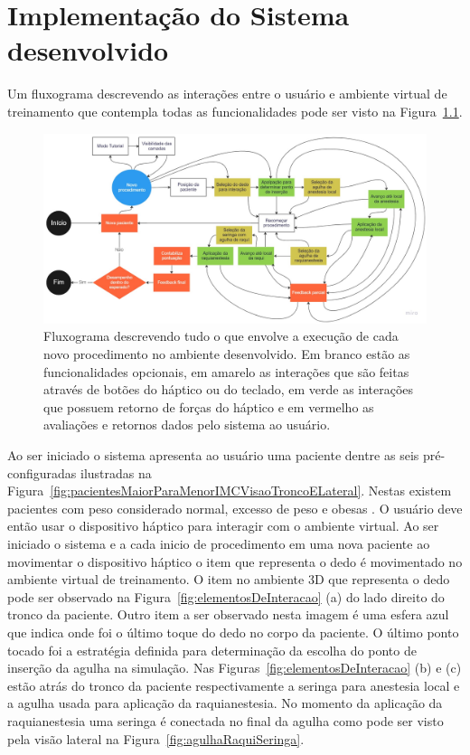 \chapter{Implementação do Sistema desenvolvido} \label{cap:cap5}

Um fluxograma descrevendo as interações entre o usuário e ambiente virtual de treinamento que contempla todas as funcionalidades pode ser visto na 
Figura~\ref{fig:fluxogramaAmbiente}.

\begin{figure}[ht!]
    \centering
    \includegraphics[width=0.98\linewidth]{capitulos/figuras/fluxograma-ambiente-desenvolvido.jpg} 
    \caption{Fluxograma descrevendo tudo o que envolve a execução de cada novo procedimento no ambiente desenvolvido. Em branco estão as funcionalidades opcionais, em amarelo as interações que são feitas através de botões do háptico ou do teclado, em verde as interações que possuem retorno de forças do háptico e em vermelho as avaliações e retornos dados pelo sistema ao usuário.}
    \label{fig:fluxogramaAmbiente}
\end{figure}

Ao ser iniciado o sistema apresenta ao usuário uma paciente dentre as seis pré-configuradas ilustradas na Figura~\ref{fig:pacientesMaiorParaMenorIMCVisaoTroncoELateral}. Nestas existem pacientes com peso considerado normal, excesso de peso e obesas \cite{MTILLC2019}. O usuário deve então usar o dispositivo háptico para interagir com o ambiente virtual. Ao ser iniciado o sistema e a cada inicio de procedimento em uma nova paciente ao movimentar o dispositivo háptico o item que representa o dedo é movimentado no ambiente virtual de treinamento. O item no ambiente 3D que representa o dedo pode ser observado na Figura~\ref{fig:elementosDeInteracao} (a) do lado direito do tronco da paciente. Outro item a ser observado nesta imagem é uma esfera azul que indica onde foi o último toque do dedo no corpo da paciente. O último ponto tocado foi a estratégia definida para determinação da escolha do ponto de inserção da agulha na simulação. Nas Figuras~\ref{fig:elementosDeInteracao} (b) e (c) estão atrás do tronco da paciente respectivamente a seringa para anestesia local e a agulha usada para aplicação da raquianestesia. No momento da aplicação da raquianestesia uma seringa é conectada no final da agulha como pode ser visto pela visão lateral na Figura~\ref{fig:agulhaRaquiSeringa}.


